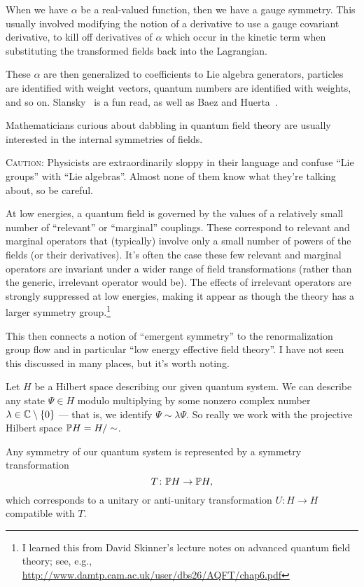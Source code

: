 \M
When we have $\alpha$ be a real-valued function, then we have a gauge
symmetry. This usually involved modifying the notion of a derivative to
use a gauge covariant derivative, to kill off derivatives of $\alpha$
which occur in the kinetic term when substituting the transformed fields
back into the Lagrangian.

These $\alpha$ are then generalized to coefficients to Lie algebra
generators, particles are identified with weight vectors, quantum
numbers are identified with weights, and so on. Slansky~\cite{Slansky:1981yr}
is a fun read, as well as Baez and Huerta~\cite{Baez:2009dj}.

\M
Mathematicians curious about dabbling in quantum field theory are
usually interested in the internal symmetries of fields. 

\textsc{Caution:} Physicists are extraordinarily sloppy in their
language and confuse ``Lie groups'' with ``Lie algebras''. Almost none
of them know what they're talking about, so be careful.

At low energies, a quantum field is governed by the values of a
relatively small number of ``relevant'' or ``marginal'' couplings. These
correspond to relevant and marginal operators that (typically) involve
only a small number of powers of the fields (or their derivatives). It's
often the case these few relevant and marginal operators are invariant
under a wider range of field transformations (rather than the generic,
irrelevant operator would be). The effects of irrelevant operators are
strongly suppressed at low energies, making it appear as though the
theory has a larger symmetry group.\footnote{I learned this from David
Skinner's lecture notes on advanced quantum field theory; see, e.g.,
\url{http://www.damtp.cam.ac.uk/user/dbs26/AQFT/chap6.pdf}}

This then connects a notion of ``emergent symmetry'' to the
renormalization group flow and in particular ``low energy effective
field theory''. I have not seen this discussed in many places, but it's
worth noting.

\begin{theorem}[Wigner]
Let $H$ be a Hilbert space describing our given quantum system.
We can describe any state $\Psi\in H$ modulo multiplying by some nonzero
complex number $\lambda\in\mathbb{C}\setminus\{0\}$ --- that is, we identify
$\Psi\sim\lambda\Psi$. So really we work with the projective Hilbert
space $\mathbb{P} H=H/\sim$.

Any symmetry of our quantum system is represented by a symmetry
transformation
\begin{equation}
T\colon\mathbb{P} H\to\mathbb{P} H,
\end{equation}
which corresponds to a unitary or anti-unitary transformation $U\colon H\to H$
compatible with $T$.
\end{theorem}

